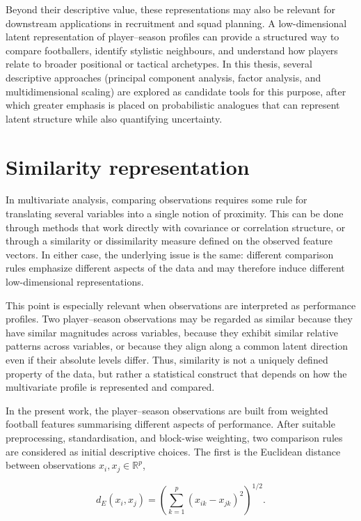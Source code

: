 Beyond their descriptive value, these representations may also be relevant for downstream applications in recruitment and squad planning. A low-dimensional latent representation of player--season profiles can provide a structured way to compare footballers, identify stylistic neighbours, and understand how players relate to broader positional or tactical archetypes. In this thesis, several descriptive approaches (principal component analysis, factor analysis, and multidimensional scaling) are explored as candidate tools for this purpose, after which greater emphasis is placed on probabilistic analogues that can represent latent structure while also quantifying uncertainty.

\section{Similarity representation}

In multivariate analysis, comparing observations requires some rule for translating several variables into a single notion of proximity. This can be done through methods that work directly with covariance or correlation structure, or through a similarity or dissimilarity measure defined on the observed feature vectors. In either case, the underlying issue is the same: different comparison rules emphasize different aspects of the data and may therefore induce different low-dimensional representations.

This point is especially relevant when observations are interpreted as performance profiles. Two player--season observations may be regarded as similar because they have similar magnitudes across variables, because they exhibit similar relative patterns across variables, or because they align along a common latent direction even if their absolute levels differ. Thus, similarity is not a uniquely defined property of the data, but rather a statistical construct that depends on how the multivariate profile is represented and compared.

In the present work, the player--season observations are built from weighted football features summarising different aspects of performance. After suitable preprocessing, standardisation, and block-wise weighting, two comparison rules are considered as initial descriptive choices. The first is the Euclidean distance between observations $x_i,x_j \in \mathbb{R}^p$,

\[
d_E(x_i,x_j)=\left(\sum_{k=1}^p (x_{ik}-x_{jk})^2\right)^{1/2}.
\]

